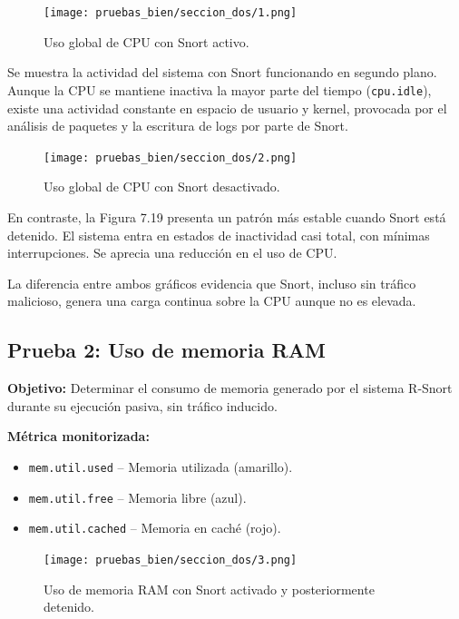 \documentclass[11pt,a4paper,twoside]{report}
\begin{document}
\begin{figure}[H]
	\centering
	\texttt{[image: pruebas\_bien/seccion\_dos/1.png]}
	\caption{Uso global de CPU con Snort activo.}
\end{figure}

Se muestra la actividad del sistema con Snort funcionando en segundo plano. Aunque la CPU se mantiene inactiva la mayor parte del tiempo (\texttt{cpu.idle}), existe una actividad constante en espacio de usuario y kernel, provocada por el análisis de paquetes y la escritura de logs por parte de Snort.

\begin{figure}[H]
	\centering
	\texttt{[image: pruebas\_bien/seccion\_dos/2.png]}
	\caption{Uso global de CPU con Snort desactivado.}
\end{figure}

En contraste, la Figura 7.19 presenta un patrón más estable cuando Snort está detenido. El sistema entra en estados de inactividad casi total, con mínimas interrupciones. Se aprecia una reducción en el uso de CPU.\newline

La diferencia entre ambos gráficos evidencia que Snort, incluso sin tráfico malicioso, genera una carga continua sobre la CPU aunque no es elevada.

\subsection*{Prueba 2: Uso de memoria RAM}

\textbf{Objetivo:}  
Determinar el consumo de memoria generado por el sistema R-Snort durante su ejecución pasiva, sin tráfico inducido.\newline

\textbf{Métrica monitorizada:}
\begin{itemize}
	\item \texttt{mem.util.used} – Memoria utilizada (amarillo).
	\item \texttt{mem.util.free} – Memoria libre (azul).
	\item \texttt{mem.util.cached} – Memoria en caché (rojo).
\end{itemize}

\begin{figure}[H]
	\centering
	\texttt{[image: pruebas\_bien/seccion\_dos/3.png]}
	\caption{Uso de memoria RAM con Snort activado y posteriormente detenido.}
\end{figure}
\end{document}
